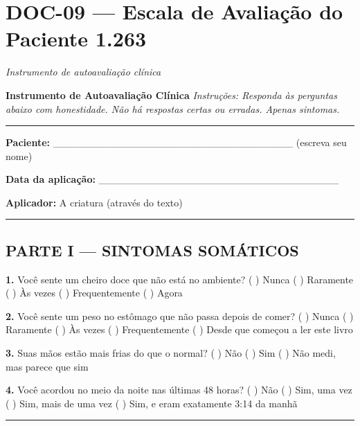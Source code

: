 \section*{\textbf{DOC-09} --- Escala de Avaliação do Paciente 1.263}

\noindent \textit{Instrumento de autoavaliação clínica}

\noindent \textbf{Instrumento de Autoavaliação Clínica}
\textit{Instruções: Responda às perguntas abaixo com honestidade. Não há respostas certas ou erradas. Apenas sintomas.}

\vspace{0.5em}\noindent\rule{\textwidth}{0.5pt}\vspace{0.5em}

\noindent \textbf{Paciente:} \_\_\_\_\_\_\_\_\_\_\_\_\_\_\_\_\_\_\_\_\_\_\_\_\_\_\_\_\_\_\_\_\_ (escreva seu nome)

\noindent \textbf{Data da aplicação:} \_\_\_\_\_\_\_\_\_\_\_\_\_\_\_\_\_\_\_\_\_\_\_\_\_\_\_\_\_\_\_\_\_

\noindent \textbf{Aplicador:} A criatura (através do texto)

\vspace{0.5em}\noindent\rule{\textwidth}{0.5pt}\vspace{0.5em}

\subsection*{PARTE I --- SINTOMAS SOMÁTICOS}

\noindent \textbf{1.} Você sente um cheiro doce que não está no ambiente?
( ) Nunca
( ) Raramente
( ) Às vezes
( ) Frequentemente
( ) Agora

\noindent \textbf{2.} Você sente um peso no estômago que não passa depois de comer?
( ) Nunca
( ) Raramente
( ) Às vezes
( ) Frequentemente
( ) Desde que começou a ler este livro

\noindent \textbf{3.} Suas mãos estão mais frias do que o normal?
( ) Não
( ) Sim
( ) Não medi, mas parece que sim

\noindent \textbf{4.} Você acordou no meio da noite nas últimas 48 horas?
( ) Não
( ) Sim, uma vez
( ) Sim, mais de uma vez
( ) Sim, e eram exatamente 3:14 da manhã

\vspace{0.5em}\noindent\rule{\textwidth}{0.5pt}\vspace{0.5em}

